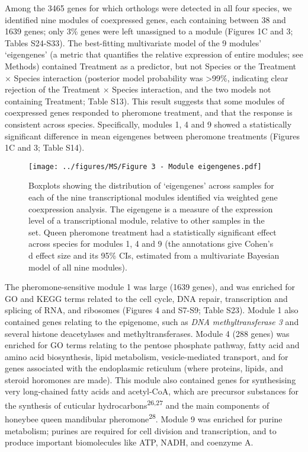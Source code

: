 \documentclass[12pt,]{article}
\begin{document}
Among the 3465 genes for which orthologs were detected in all four
species, we identified nine modules of coexpressed genes, each
containing between 38 and 1639 genes; only 3\% genes were left
unassigned to a module (Figures 1C and 3; Tables S24-S33). The
best-fitting multivariate model of the 9 modules' `eigengenes' (a metric
that quantifies the relative expression of entire modules; see Methods)
contained Treatment as a predictor, but not Species or the Treatment
\(\times\) Species interaction (posterior model probability was
\textgreater{}99\%, indicating clear rejection of the Treatment
\(\times\) Species interaction, and the two models not containing
Treatment; Table S13). This result suggests that some modules of
coexpressed genes responded to pheromone treatment, and that the
response is consistent across species. Specifically, modules 1, 4 and 9
showed a statistically significant difference in mean eigengenes between
pheromone treatments (Figures 1C and 3; Table S14).

\begin{figure}
\centering
\texttt{[image: ../figures/MS/Figure 3 - Module eigengenes.pdf]}
\caption{\footnotesize Boxplots showing the distribution of `eigengenes'
across samples for each of the nine transcriptional modules identified
via weighted gene coexpression analysis. The eigengene is a measure of
the expression level of a transcriptional module, relative to other
samples in the set. Queen pheromone treatment had a statistically
significant effect across species for modules 1, 4 and 9 (the
annotations give Cohen's d effect size and its 95\% CIs, estimated from
a multivariate Bayesian model of all nine modules). \label{fig3}}
\end{figure}

The pheromone-sensitive module 1 was large (1639 genes), and was
enriched for GO and KEGG terms related to the cell cycle, DNA repair,
transcription and splicing of RNA, and ribosomes (Figures 4 and S7-S9;
Table S23). Module 1 also contained genes relating to the epigenome,
such as \emph{DNA methyltransferase 3} and several histone deacetylases
and methyltransferases. Module 4 (288 genes) was enriched for GO terms
relating to the pentose phosphate pathway, fatty acid and amino acid
biosynthesis, lipid metabolism, vesicle-mediated transport, and for
genes associated with the endoplasmic reticulum (where proteins, lipids,
and steroid horomones are made). This module also contained genes for
synthesising very long-chained fatty acids and acetyl-CoA, which are
precursor substances for the synthesis of cuticular
hydrocarbons\textsuperscript{26,27} and the main components of honeybee
queen mandibular pheromone\textsuperscript{28}. Module 9 was enriched
for purine metabolism; purines are required for cell division and
transcription, and to produce important biomolecules like ATP, NADH, and
coenzyme A.
\end{document}
